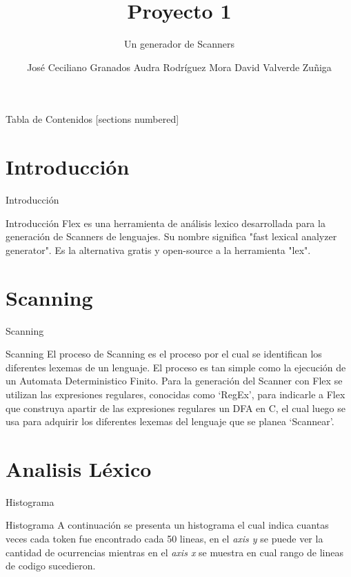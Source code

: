 \documentclass[10pt,xcolor={dvipsnames}]{beamer}
\title{Proyecto 1}
\subtitle{Un generador de Scanners}
\date{}
\author{
    José Ceciliano Granados\newline 2016087245 
    \newline \newline 
    Audra Rodríguez Mora \newline 2015101893  
    \newline \newline 
    David Valverde Zuñiga \newline 200922986
}
\institute{Instituto Tecnológico de Costa Rica
    \newline Compiladores e Intérpretes
    \newline I Semestre 2019 }
\begin{document}
    \maketitle
    \begin{frame}{Tabla de Contenidos}
      [sections numbered]
      \tableofcontents[hideallsubsections]
    \end{frame}
    
    
    \section{Introducción}
        \begin{frame}[fragile]{Introducción}
        \begin{alertblock}{Introducción}
                Flex es una herramienta de análisis lexico desarrollada para la generación de Scanners de lenguajes. Su nombre significa "fast lexical analyzer generator". Es la alternativa gratis y open-source a la herramienta "lex". 
        \end{alertblock}
        \end{frame}


    \section{Scanning}
        \begin{frame}[fragile]{Scanning}
            \begin{alertblock}{Scanning}
                El proceso de Scanning es el proceso por el cual se identifican los diferentes lexemas de un lenguaje. El proceso es tan simple como la ejecución de un Automata Deterministico Finito. Para la generación del Scanner con Flex se utilizan las expresiones regulares, conocidas como `RegEx', para indicarle a Flex que construya apartir de las expresiones regulares un DFA en C, el cual luego se usa para adquirir los diferentes lexemas del lenguaje que se planea `Scannear'.
            \end{alertblock}
        \end{frame}


    \section{Analisis Léxico}
        \begin{frame}{Histograma}
        \begin{alertblock}{Histograma}
            A continuación se presenta un histograma el cual indica cuantas veces cada token fue encontrado cada 50 lineas, en el \textit{axis y} se puede ver la cantidad de ocurrencias mientras en el \textit{axis x} se muestra en cual rango de lineas de codigo sucedieron.
            \end{alertblock}
        \end{frame}
    
\end{document}
